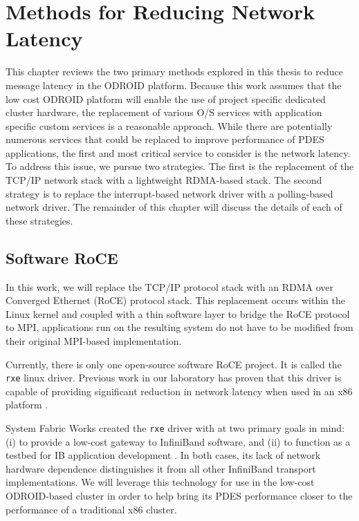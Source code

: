 \documentclass[11pt]{book}
\begin{document}
\chapter{Methods for Reducing Network Latency}\label{latency_reduction}


This chapter reviews the two primary methods explored in this thesis to reduce message
latency in the ODROID platform.  Because this work assumes that the low cost ODROID
platform will enable the use of project specific dedicated cluster hardware, the
replacement of various O/S services with application specific custom services is a
reasonable approach.  While there are potentially numerous services that could be replaced
to improve performance of PDES applications, the first and most critical service to
consider is the network latency.  To address this issue, we pursue two strategies.  The
first is the replacement of the TCP/IP network stack with a lightweight RDMA-based stack.
The second strategy is to replace the interrupt-based network driver with a polling-based
network driver.  The remainder of this chapter will discuss the details of each of these
strategies. 

\section{Software RoCE}


In this work, we will replace the TCP/IP protocol stack with an RDMA over Converged
Ethernet (RoCE) protocol stack.  This replacement occurs within the Linux kernel and
coupled with a thin software layer to bridge the RoCE protocol to MPI, applications run on
the resulting system do not have to be modified from their original MPI-based
implementation. 

Currently, there is only one open-source software RoCE project.  It is called the
\verb;rxe; linux driver.  Previous work in our laboratory has proven that this driver is
capable of providing significant reduction in network latency when used in an x86 platform
\cite{lancaster-10}. 

System Fabric Works created the \verb;rxe; driver with at two primary goals in mind: (i)
to provide a low-cost gateway to InfiniBand software, and (ii) to function as a testbed
for IB application development \cite{pearson-10}.  In both cases, its lack of network
hardware dependence distinguishes it from all other InfiniBand transport implementations.
We will leverage this technology for use in the low-cost ODROID-based cluster in order to
help bring its PDES performance closer to the performance of a traditional x86 cluster.
\end{document}
